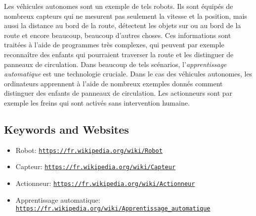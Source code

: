 \documentclass[a4paper,11pt]{report}
\newcommand{\BrochureUrlText}[1]{\texttt{#1}}
\begin{document}
Les véhicules autonomes sont un exemple de tels robots. Ils sont équipés de nombreux capteurs qui ne mesurent pas seulement la vitesse et la position, mais aussi la distance au bord de la route, détectent les objets sur ou au bord de la route et encore beaucoup, beaucoup d’autres choses. Ces informations sont traitées à l’aide de programmes très complexes, qui peuvent par exemple reconnaître des enfants qui pourraient traverser la route et les distinguer de panneaux de circulation. Dans beaucoup de tels scénarios, l’\emph{apprentissage automatique} est une technologie cruciale. Dans le cas des véhicules autonomes, les ordinateurs apprennent à l’aide de nombreux exemples donnés comment distinguer des enfants de panneaux de circulation. Les actionneurs sont par exemple les freins qui sont activés sans intervention humaine.

{\raggedright

\subsection*{Keywords and Websites}

\begin{itemize}
  \item Robot: \href{https://fr.wikipedia.org/wiki/Robot}{\BrochureUrlText{https://fr.wikipedia.org/wiki/Robot}}
  \item Capteur: \href{https://fr.wikipedia.org/wiki/Capteur}{\BrochureUrlText{https://fr.wikipedia.org/wiki/Capteur}}
  \item Actionneur: \href{https://fr.wikipedia.org/wiki/Actionneur}{\BrochureUrlText{https://fr.wikipedia.org/wiki/Actionneur}}
  \item Apprentissage automatique: \href{https://fr.wikipedia.org/wiki/Apprentissage_automatique}{\BrochureUrlText{https://fr.wikipedia.org/wiki/Apprentissage\_automatique}}
\end{itemize}


}
\end{document}
